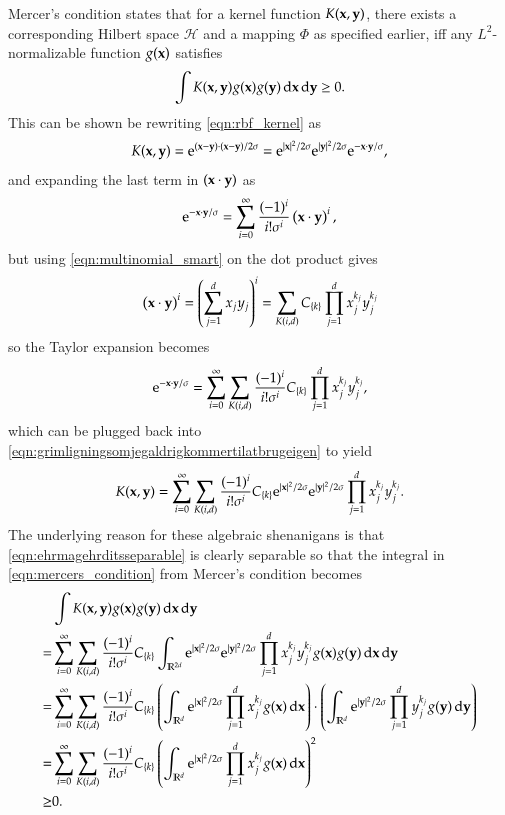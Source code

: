 Mercer's condition\cite{Smola1998} states that for a kernel function $K(\mathbf{x}, \mathbf{y})$, there exists a corresponding Hilbert space $\mathcal{H}$ and a mapping $\Phi$ as specified earlier, iff any $L^2$-normalizable function $g(\mathbf{x})$ satisfies
\begin{equation}
	\int K(\mathbf{x}, \mathbf{y}) g(\mathbf{x}) g(\mathbf{y}) \operatorname{d\!}\mathbf{x} \operatorname{d\!}\mathbf{y} \ge 0. \label{eqn:mercers_condition}
\end{equation}
This can be shown be rewriting \eqref{eqn:rbf_kernel} as
\begin{equation}
	K(\mathbf{x}, \mathbf{y}) = \mathrm{e}^{(\mathbf{x}-\mathbf{y})\cdot(\mathbf{x}-\mathbf{y})/2\sigma} = \mathrm{e}^{|\mathbf{x}|^2/2\sigma} \mathrm{e}^{|\mathbf{y}|^2/2\sigma} \mathrm{e}^{-\mathbf{x}\cdot\mathbf{y}/\sigma}, \label{eqn:grimligningsomjegaldrigkommertilatbrugeigen}
\end{equation}
and expanding the last term in $(\mathbf{x}\cdot\mathbf{y})$ as
\begin{equation}
	\mathrm{e}^{-\mathbf{x}\cdot\mathbf{y}/\sigma} = \sum_{i=0}^\infty \frac{(-1)^i}{i!\sigma^i} \left( \mathbf{x}\cdot\mathbf{y} \right)^i,
\end{equation}
but using \eqref{eqn:multinomial_smart} on the dot product gives
\begin{equation}
	\left( \mathbf{x}\cdot\mathbf{y} \right)^i = \left( \sum_{j=1}^d x_j y_j \right)^i = \sum_{K(i,d)} C_{\left\{ k \right\}} \prod_{j = 1}^d x_j^{k_j} y_j^{k_j}
\end{equation}
so the Taylor expansion becomes
\begin{equation}
	\mathrm{e}^{-\mathbf{x}\cdot\mathbf{y}/\sigma} = \sum_{i=0}^\infty \sum_{K(i,d)} \frac{(-1)^i}{i!\sigma^i}  C_{\left\{ k \right\}}  \prod_{j = 1}^d x_j^{k_j} y_j^{k_j},
\end{equation}
which can be plugged back into \eqref{eqn:grimligningsomjegaldrigkommertilatbrugeigen} to yield
\begin{equation}
	K(\mathbf{x}, \mathbf{y}) = \sum_{i=0}^\infty \sum_{K(i,d)} \frac{(-1)^i}{i!\sigma^i}  C_{\left\{ k \right\}} \mathrm{e}^{|\mathbf{x}|^2/2\sigma} \mathrm{e}^{|\mathbf{y}|^2/2\sigma} \prod_{j = 1}^d x_j^{k_j} y_j^{k_j}. \label{eqn:ehrmagehrditsseparable}
\end{equation}
The underlying reason for these algebraic shenanigans is that \eqref{eqn:ehrmagehrditsseparable} is clearly separable so that the integral in \eqref{eqn:mercers_condition} from Mercer's condition becomes
\begin{align}
	& \int K(\mathbf{x}, \mathbf{y}) g(\mathbf{x}) g(\mathbf{y}) \operatorname{d\!}\mathbf{x} \operatorname{d\!}\mathbf{y} \\
	 = & \sum_{i=0}^\infty \sum_{K(i,d)} \frac{(-1)^i}{i!\sigma^i}  C_{\left\{ k \right\}} \int_{\mathbb{R}^{2d}} \mathrm{e}^{|\mathbf{x}|^2/2\sigma} \mathrm{e}^{|\mathbf{y}|^2/2\sigma} \prod_{j = 1}^d x_j^{k_j} y_j^{k_j} g(\mathbf{x}) g(\mathbf{y}) \operatorname{d\!}\mathbf{x}\operatorname{d\!}\mathbf{y} \\
	= &\sum_{i=0}^\infty \sum_{K(i,d)} \frac{(-1)^i}{i!\sigma^i}  C_{\left\{ k \right\}} \left(\int_{\mathbb{R}^{d}} \mathrm{e}^{|\mathbf{x}|^2/2\sigma} \prod_{j = 1}^d x_j^{k_j} g(\mathbf{x}) \operatorname{d\!}\mathbf{x} \right)\cdot
	  \left(\int_{\mathbb{R}^{d}} \mathrm{e}^{|\mathbf{y}|^2/2\sigma} \prod_{j = 1}^d y_j^{k_j} g(\mathbf{y}) \operatorname{d\!}\mathbf{y} \right) \\
	= &\sum_{i=0}^\infty \sum_{K(i,d)} \frac{(-1)^i}{i!\sigma^i}  C_{\left\{ k \right\}} \left(\int_{\mathbb{R}^{d}} \mathrm{e}^{|\mathbf{x}|^2/2\sigma} \prod_{j = 1}^d x_j^{k_j} g(\mathbf{x}) \operatorname{d\!}\mathbf{x} \right)^2 \\
	\ge & 0.
\end{align}
